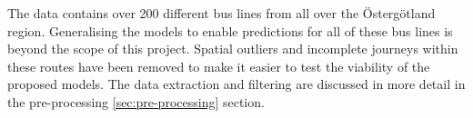 The data contains over 200 different bus lines from all over the Östergötland region. Generalising the models to enable predictions for all of these bus lines is beyond the scope of this project. Spatial outliers and incomplete journeys within these routes have been removed to make it easier to test the viability of the proposed models. The data extraction and filtering are discussed in more detail in the pre-processing \ref{sec:pre-processing} section.




